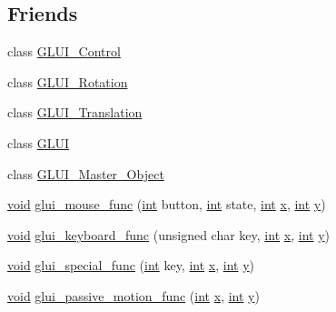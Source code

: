 \subsection*{Friends}
\begin{DoxyCompactItemize}
\item 
class \hyperlink{class_g_l_u_i___main_a1ac6a21915ff78bdda7d92427b2b9337}{G\+L\+U\+I\+\_\+\+Control}
\item 
class \hyperlink{class_g_l_u_i___main_a7f68b21cd9d98467322b20fd2d4c739c}{G\+L\+U\+I\+\_\+\+Rotation}
\item 
class \hyperlink{class_g_l_u_i___main_a1c751e686f087581ee115c051b63e3ff}{G\+L\+U\+I\+\_\+\+Translation}
\item 
class \hyperlink{class_g_l_u_i___main_a8b2353bef6e8c665a923971433c0c999}{G\+L\+U\+I}
\item 
class \hyperlink{class_g_l_u_i___main_a89d3c98d28cb65cd25c91f17ffcd2bdf}{G\+L\+U\+I\+\_\+\+Master\+\_\+\+Object}
\item 
\hyperlink{wglext_8h_a9e6b7f1933461ef318bb000d6bd13b83}{void} \hyperlink{class_g_l_u_i___main_a6385df2c931519beca286ede9e098f96}{glui\+\_\+mouse\+\_\+func} (\hyperlink{wglext_8h_a500a82aecba06f4550f6849b8099ca21}{int} button, \hyperlink{wglext_8h_a500a82aecba06f4550f6849b8099ca21}{int} state, \hyperlink{wglext_8h_a500a82aecba06f4550f6849b8099ca21}{int} \hyperlink{glext_8h_ad77deca22f617d3f0e0eb786445689fc}{x}, \hyperlink{wglext_8h_a500a82aecba06f4550f6849b8099ca21}{int} \hyperlink{glext_8h_a9298c7ad619074f5285b32c6b72bfdea}{y})
\item 
\hyperlink{wglext_8h_a9e6b7f1933461ef318bb000d6bd13b83}{void} \hyperlink{class_g_l_u_i___main_ae3390518e45a04617135f564021bcebf}{glui\+\_\+keyboard\+\_\+func} (unsigned char key, \hyperlink{wglext_8h_a500a82aecba06f4550f6849b8099ca21}{int} \hyperlink{glext_8h_ad77deca22f617d3f0e0eb786445689fc}{x}, \hyperlink{wglext_8h_a500a82aecba06f4550f6849b8099ca21}{int} \hyperlink{glext_8h_a9298c7ad619074f5285b32c6b72bfdea}{y})
\item 
\hyperlink{wglext_8h_a9e6b7f1933461ef318bb000d6bd13b83}{void} \hyperlink{class_g_l_u_i___main_a457caba107a71dff1918cb7dd271e8f1}{glui\+\_\+special\+\_\+func} (\hyperlink{wglext_8h_a500a82aecba06f4550f6849b8099ca21}{int} key, \hyperlink{wglext_8h_a500a82aecba06f4550f6849b8099ca21}{int} \hyperlink{glext_8h_ad77deca22f617d3f0e0eb786445689fc}{x}, \hyperlink{wglext_8h_a500a82aecba06f4550f6849b8099ca21}{int} \hyperlink{glext_8h_a9298c7ad619074f5285b32c6b72bfdea}{y})
\item 
\hyperlink{wglext_8h_a9e6b7f1933461ef318bb000d6bd13b83}{void} \hyperlink{class_g_l_u_i___main_a783f2a1497c9cc9e2f8c45244c20cc5e}{glui\+\_\+passive\+\_\+motion\+\_\+func} (\hyperlink{wglext_8h_a500a82aecba06f4550f6849b8099ca21}{int} \hyperlink{glext_8h_ad77deca22f617d3f0e0eb786445689fc}{x}, \hyperlink{wglext_8h_a500a82aecba06f4550f6849b8099ca21}{int} \hyperlink{glext_8h_a9298c7ad619074f5285b32c6b72bfdea}{y})

\end{DoxyCompactItemize}
